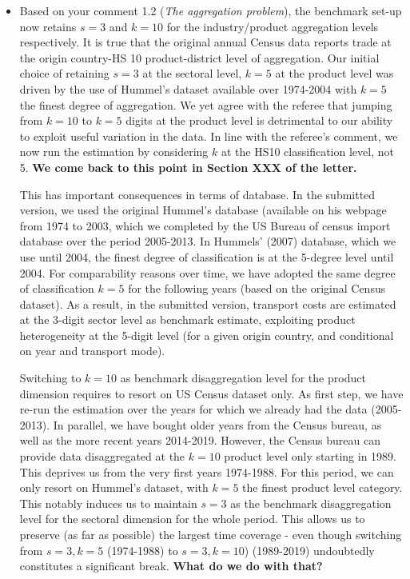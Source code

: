 \documentclass[a4paper,12pt]{article}
\begin{document}
\begin{itemize}
\item Based on your comment 1.2 (\textit{The aggregation problem}), the benchmark set-up now retains $s=3$ and $k=10$ for the industry/product aggregation levels respectively. It is true that the original annual Census data reports trade at the origin country-HS 10 product-district level of aggregation. Our initial choice of retaining $s=3$ at the sectoral level, $k=5$ at the product level was driven by the use of Hummel's dataset available over 1974-2004 with $k=5$ the finest degree of aggregation. We yet agree with the referee that jumping from $k=10$ to $k=5$ digits at the product level is detrimental to our ability to exploit useful variation in the data. In line with the referee's comment, we now run the estimation by considering $k$ at the HS10 classification level, not 5. \textbf{We come back to this point in Section XXX of the letter.}

    This has important consequences in terms of database. In the submitted version, we used the original Hummel's database (available on his webpage from 1974 to 2003, which we completed by the US Bureau of census import database over the period 2005-2013. In Hummels' (2007) database, which we use until 2004, the finest degree of classification is at the 5-degree level until 2004. For comparability reasons over time, we have adopted the same degree of classification $k=5$ for the following years (based on the original Census dataset). As a result, in the submitted version, transport costs are estimated at the 3-digit sector level as benchmark estimate, exploiting product heterogeneity at the 5-digit level (for a given origin country, and conditional on year and transport mode).

    Switching to $k=10$ as benchmark disaggregation level for the product dimension requires to resort on US Census dataset only. As first step, we have re-run the estimation over the years for which we already had the data (2005-2013). In parallel, we have bought older years from the Census bureau, as well as the more recent years 2014-2019. However, the Census bureau can provide data disaggregated at the $k=10$ product level only starting in 1989. This deprives us from the very first years 1974-1988. For this period, we can only resort on Hummel's dataset, with $k=5$ the finest product level category. This notably induces us to maintain $s=3$ as the benchmark disaggregation level for the sectoral dimension for the whole period. This allows us to preserve (as far as possible) the largest time coverage - even though switching from $s=3, k=5$ (1974-1988) to $s=3, k=10$) (1989-2019) undoubtedly constitutes a significant break. \textbf{What do we do with that?}




\end{itemize}
\end{document}
